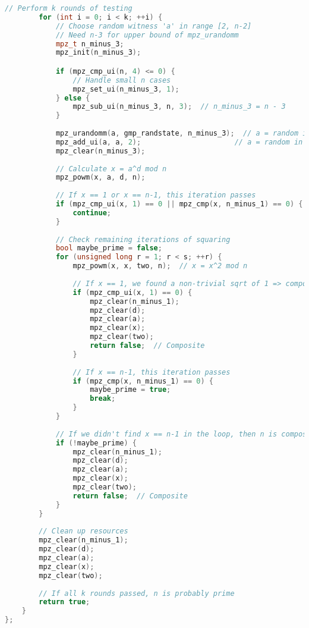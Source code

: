 \begin{lstlisting}[language=C++, caption=Miller-Rabin Primality Test Implementation]
        // Perform k rounds of testing
        for (int i = 0; i < k; ++i) {
            // Choose random witness 'a' in range [2, n-2]
            // Need n-3 for upper bound of mpz_urandomm
            mpz_t n_minus_3;
            mpz_init(n_minus_3);

            if (mpz_cmp_ui(n, 4) <= 0) {
                // Handle small n cases
                mpz_set_ui(n_minus_3, 1);
            } else {
                mpz_sub_ui(n_minus_3, n, 3);  // n_minus_3 = n - 3
            }
            
            mpz_urandomm(a, gmp_randstate, n_minus_3);  // a = random in [0, n-4]
            mpz_add_ui(a, a, 2);                      // a = random in [2, n-2]
            mpz_clear(n_minus_3);
            
            // Calculate x = a^d mod n
            mpz_powm(x, a, d, n);
            
            // If x == 1 or x == n-1, this iteration passes
            if (mpz_cmp_ui(x, 1) == 0 || mpz_cmp(x, n_minus_1) == 0) {
                continue;
            }
            
            // Check remaining iterations of squaring
            bool maybe_prime = false;
            for (unsigned long r = 1; r < s; ++r) {
                mpz_powm(x, x, two, n);  // x = x^2 mod n
                
                // If x == 1, we found a non-trivial sqrt of 1 => composite
                if (mpz_cmp_ui(x, 1) == 0) {
                    mpz_clear(n_minus_1);
                    mpz_clear(d);
                    mpz_clear(a);
                    mpz_clear(x);
                    mpz_clear(two);
                    return false;  // Composite
                }
                
                // If x == n-1, this iteration passes
                if (mpz_cmp(x, n_minus_1) == 0) {
                    maybe_prime = true;
                    break;
                }
            }
            
            // If we didn't find x == n-1 in the loop, then n is composite
            if (!maybe_prime) {
                mpz_clear(n_minus_1);
                mpz_clear(d);
                mpz_clear(a);
                mpz_clear(x);
                mpz_clear(two);
                return false;  // Composite
            }
        }
        
        // Clean up resources
        mpz_clear(n_minus_1);
        mpz_clear(d);
        mpz_clear(a);
        mpz_clear(x);
        mpz_clear(two);
        
        // If all k rounds passed, n is probably prime
        return true;
    }
};
\end{lstlisting}

